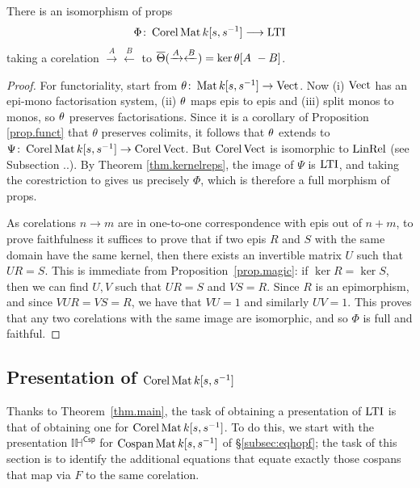 \begin{theorem}\label{thm.main}
  There is an isomorphism of props 
  \[
    \Phi{\colon} \operatorname{{Corel}}\operatorname{\mathrm{Mat}}{k[s,s^{-1}]} \longrightarrow \operatorname{\mathrm{LTI}}
  \]
  taking a corelation $\xrightarrow{A}\xleftarrow{B}$ 
  to $\overline{\Theta}(\xrightarrow{A}\xleftarrow{B}) = {\ker\theta [A \ -B]}$.
\end{theorem}
\begin{proof}
  For functoriality, start from $\theta{\colon}\operatorname{\mathrm{Mat}}{k[s,s^{-1}]} \to
  \operatorname{\mathrm{Vect}}$. Now (i) $\operatorname{\mathrm{Vect}}$ has an epi-mono factorisation system, (ii)
  $\theta$ maps epis to epis and (iii) split monos to monos, so $\theta$
  preserves factorisations. Since it is a corollary of Proposition \ref{prop.funct}
  that $\theta$ preserves colimits, it follows that $\theta$ extends to
   $\Psi{\colon}\operatorname{{Corel}}\operatorname{\mathrm{Mat}}{k[s,s^{-1}]} \to \operatorname{{Corel}}\operatorname{\mathrm{Vect}}$. But $\operatorname{{Corel}}\operatorname{\mathrm{Vect}}$ is
  isomorphic to $\operatorname{\mathrm{LinRel}}$ (see Subsection ..). 
  By Theorem \ref{thm.kernelreps}, the image of $\Psi$ is $\operatorname{\mathrm{LTI}}$, and taking
  the corestriction to gives us precisely $\Phi$, which is therefore a full
  morphism of props.

  As corelations $n \to m$ are in one-to-one correspondence with epis out of
  $n+m$, to prove faithfulness it suffices to prove that if two epis $R$ and $S$
  with the same domain have the same kernel, then there exists an invertible
  matrix $U$ such that $UR =S$. This is immediate from
  Proposition~\ref{prop.magic}: if $\ker R= \ker S$, then we can find $U, V$
  such that $UR = S$ and $VS = R$. Since $R$ is an epimorphism, and since $VUR =
  VS = R$, we have that $VU=1$ and similarly $UV =1$. This proves that any two
  corelations with the same image are isomorphic, and so $\Phi$ is full and
  faithful.  
\end{proof}


\subsection{Presentation of $\operatorname{{Corel}}\operatorname{\mathrm{Mat}}{k[s,s^{-1}]}$}


Thanks to Theorem~\ref{thm.main}, the task of obtaining a presentation of $\operatorname{\mathrm{LTI}}$
is that of obtaining one for $\operatorname{{Corel}}\operatorname{\mathrm{Mat}}{k[s,s^{-1}]}$. 
%
To do this, we start with the presentation
$\mathbb{IH}^{\textsf{Csp}}$ for $\operatorname{{Cospan}}\operatorname{\mathrm{Mat}}{k[s,s^{-1}]}$ of \S\ref{subsec:eqhopf}; the task of
this section is to identify the additional equations that equate
exactly those cospans that map via $F$ to the same corelation.

